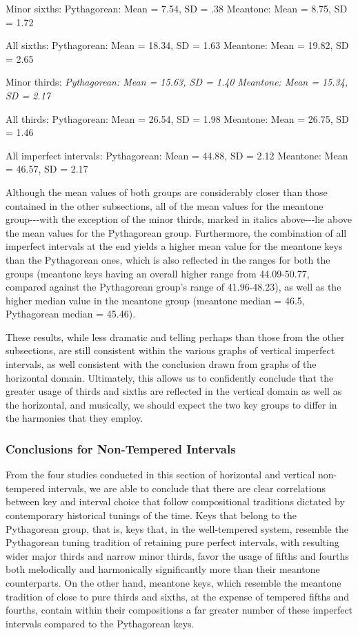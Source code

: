 Minor sixths: Pythagorean: Mean = 7.54, SD = .38 Meantone: Mean = 8.75,
SD = 1.72

All sixths: Pythagorean: Mean = 18.34, SD = 1.63 Meantone: Mean = 19.82,
SD = 2.65

Minor thirds: \emph{Pythagorean: Mean = 15.63, SD = 1.40}
\emph{Meantone: Mean = 15.34, SD = 2.17}

All thirds: Pythagorean: Mean = 26.54, SD = 1.98 Meantone: Mean = 26.75,
SD = 1.46

All imperfect intervals: Pythagorean: Mean = 44.88, SD = 2.12 Meantone:
Mean = 46.57, SD = 2.17

Although the mean values of both groups are considerably closer than
those contained in the other subsections, all of the mean values for the
meantone group-\/-\/-with the exception of the minor thirds, marked in
italics above-\/-\/-lie above the mean values for the Pythagorean group.
Furthermore, the combination of all imperfect intervals at the end
yields a higher mean value for the meantone keys than the Pythagorean
ones, which is also reflected in the ranges for both the groups
(meantone keys having an overall higher range from 44.09-50.77, compared
against the Pythagorean group's range of 41.96-48.23), as well as the
higher median value in the meantone group (meantone median = 46.5,
Pythagorean median = 45.46).

These results, while less dramatic and telling perhaps than those from
the other subsections, are still consistent within the various graphs of
vertical imperfect intervals, as well consistent with the conclusion
drawn from graphs of the horizontal domain. Ultimately, this allows us
to confidently conclude that the greater usage of thirds and sixths are
reflected in the vertical domain as well as the horizontal, and
musically, we should expect the two key groups to differ in the
harmonies that they employ.

\subsubsection{Conclusions for Non-Tempered
Intervals}\label{conclusions-for-non-tempered-intervals}

From the four studies conducted in this section of horizontal and
vertical non-tempered intervals, we are able to conclude that there are
clear correlations between key and interval choice that follow
compositional traditions dictated by contemporary historical tunings of
the time. Keys that belong to the Pythagorean group, that is, keys that,
in the well-tempered system, resemble the Pythagorean tuning tradition
of retaining pure perfect intervals, with resulting wider major thirds
and narrow minor thirds, favor the usage of fifths and fourths both
melodically and harmonically significantly more than their meantone
counterparts. On the other hand, meantone keys, which resemble the
meantone tradition of close to pure thirds and sixths, at the expense of
tempered fifths and fourths, contain within their compositions a far
greater number of these imperfect intervals compared to the Pythagorean
keys.

